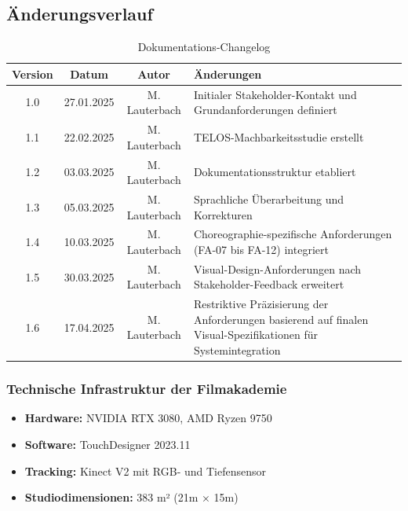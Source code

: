 \subsection{Änderungsverlauf}
\begin{table}[h]
    \centering
    \begin{tabular}{|c|c|c|p{7cm}|}
        \hline
        \textbf{Version} & \textbf{Datum} & \textbf{Autor} & \textbf{Änderungen} \\ \hline
        1.0 & 27.01.2025 & M. Lauterbach & Initialer Stakeholder-Kontakt und Grundanforderungen definiert \\ \hline
        1.1 & 22.02.2025 & M. Lauterbach & TELOS-Machbarkeitsstudie erstellt \\ \hline
        1.2 & 03.03.2025 & M. Lauterbach & Dokumentationsstruktur etabliert \\ \hline
        1.3 & 05.03.2025 & M. Lauterbach & Sprachliche Überarbeitung und Korrekturen \\ \hline
        1.4 & 10.03.2025 & M. Lauterbach & Choreographie-spezifische Anforderungen (FA-07 bis FA-12) integriert \\ \hline
        1.5 & 30.03.2025 & M. Lauterbach & Visual-Design-Anforderungen nach Stakeholder-Feedback erweitert \\ \hline
        1.6 & 17.04.2025 & M. Lauterbach & Restriktive Präzisierung der Anforderungen basierend auf finalen Visual-Spezifikationen für Systemintegration \\ \hline
    \end{tabular}
    \caption{Dokumentations-Changelog}
    \label{tab:changelog}
\end{table}

\subsubsection{Technische Infrastruktur der Filmakademie}
\begin{itemize}
    \item \textbf{Hardware:} NVIDIA RTX 3080, AMD Ryzen 9750
    \item \textbf{Software:} TouchDesigner 2023.11
    \item \textbf{Tracking:} Kinect V2 mit RGB- und Tiefensensor
    \item \textbf{Studiodimensionen:} 383 m² (21m × 15m)
\end{itemize}


